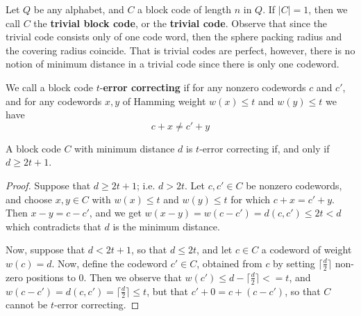 \begin{example}\label{example_1.3}
  Let $Q$ be any alphabet, and $C$ a block code of length $n$ in $Q$. If
  $|C|=1$, then we call  $C$ the  \textbf{trivial block code}, or the
  \textbf{trivial code}. Observe that since the trivial code consists only of
  one code word, then the sphere packing radius and the covering radius
  coincide. That is trivial codes are perfect, however, there is no notion of
  minimum distance in a trivial code since there is only one codeword.
\end{example}

\begin{definition}
  We call a block code $t$-\textbf{error correcting} if for any nonzero
  codewords $c$ and $c'$, and for any codewords $x,y$ of Hamming weight  $w(x)
  \leq t$ and $w(y) \leq t$ we have
  \begin{equation*}
    c+x \neq c'+y
  \end{equation*}
\end{definition}

\begin{theorem}\label{theorem_1.1.3}
  A block code $C$ with minimum distance $d$ is $t$-error correcting if, and
  only if  $d \geq 2t+1$.
\end{theorem}
\begin{proof}
  Suppose that $d \geq 2t+1$; i.e. $d>2t$. Let $c,c' \in C$ be nonzero
  codewords, and choose $x,y \in C$ with $w(x) \leq t$ and $w(y) \leq t$ for
  which $c+x=c'+y$. Then $x-y=c-c'$, and we get $w(x-y)=w(c-c')=d(c,c') \leq
  2t<d$ which contradicts that $d$ is the minimum distance.

  Now, suppose that  $d<2t+1$, so that $d \leq 2t$, and let $c \in C$ a codeword
  of weight $w(c)=d$. Now, define the codeword $c' \in C$, obtained from $c$ by
  setting $\lceil \frac{d}{2} \rceil$ non-zero positions to $0$. Then we observe
  that  $w(c') \leq d-\lceil \frac{d}{2} \rceil<=t$, and $w(c-c')=d(c,c')=
  \lceil \frac{d}{2} \rceil \leq t$, but that $c'+0=c+(c-c')$, so that $C$
  cannot be  $t$-error correcting.
\end{proof}
